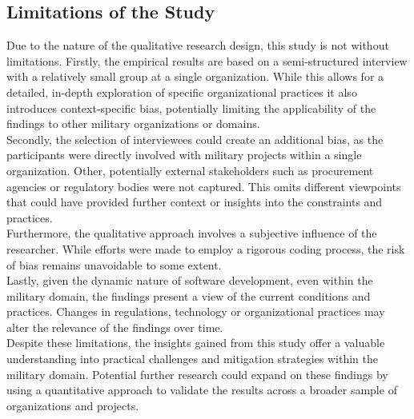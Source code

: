 \subsection{Limitations of the Study}
Due to the nature of the qualitative research design, this study is not without limitations. Firstly, the empirical results are based on a semi-structured interview with a relatively small group at a single organization.
While this allows for a detailed, in-depth exploration of specific organizational practices it also introduces context-specific bias, potentially limiting the applicability of the findings to other military organizations or domains.\\

Secondly, the selection of interviewees could create an additional bias, as the participants were directly involved with military projects within a single organization. Other, potentially external stakeholders such as procurement agencies
or regulatory bodies were not captured. This omits different viewpoints that could have provided further context or insights into the constraints and practices.\\

Furthermore, the qualitative approach involves a subjective influence of the researcher. While efforts were made to employ a rigorous coding process, the risk of bias remains unavoidable to some extent.\\

Lastly, given the dynamic nature of software development, even within the military domain, the findings present a view of the current conditions and practices. Changes in regulations, technology or organizational practices may alter the relevance of the findings over time.\\

Despite these limitations, the insights gained from this study offer a valuable understanding into practical challenges and mitigation strategies within the military domain. Potential further research could expand on these findings by using a quantitative approach to validate the results across a broader sample of organizations and projects.
